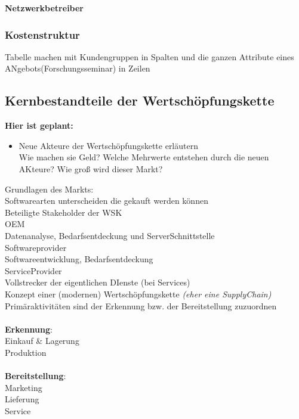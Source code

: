 \textbf{Netzwerkbetreiber}\\

\subsubsection{Kostenstruktur}
Tabelle machen mit Kundengruppen in Spalten und die ganzen Attribute eines ANgebots(Forschungsseminar) in Zeilen\\

\subsection{Kernbestandteile der Wertschöpfungskette}\label{anwendungsfall}

\textbf{Hier ist geplant:}
\begin{itemize}
	\item Neue Akteure der Wertschöpfungskette erläutern\\
	Wie machen sie Geld? Welche Mehrwerte entstehen durch die neuen AKteure? Wie groß wird dieser Markt?
\end{itemize}

Grundlagen des Markts:\\
Softwarearten unterscheiden die gekauft werden können\\
Beteiligte Stakeholder der WSK\\
OEM \\
Datenanalyse, Bedarfsentdeckung und ServerSchnittstelle\\
Softwareprovider\\
Softwareentwicklung, Bedarfsentdeckung \\
ServiceProvider\\
Vollstrecker der eigentlichen DIenste (bei Services)\\
Konzept einer (modernen) Wertschöpfungskette\textit{ (eher eine SupplyChain)}\\
Primäraktivitäten sind der Erkennung bzw. der Bereitstellung zuzuordnen\\\\
\textbf{Erkennung}: \\
	Einkauf \& Lagerung\\
	Produktion\\\\
\textbf{Bereitstellung}:\\
	Marketing\\
	Lieferung\\
	Service\\

